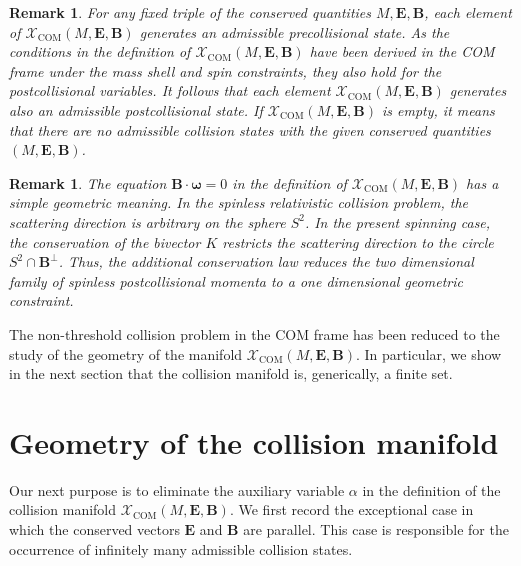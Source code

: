 \documentclass[10pt,a4paper]{amsart}
\newtheorem{remark}[theorem]{Remark}
\begin{document}
\begin{remark}
For any fixed triple of the conserved quantities $M, {\bm E}, {\bm B}$, each element of $\mathcal{X}_\mathrm{COM}(M, {\bm E}, {\bm B})$ generates an admissible precollisional state. As the conditions in the definition of $\mathcal{X}_\mathrm{COM}(M,{\bm E}, {\bm B})$ have been derived in the COM frame under the mass shell and spin constraints, they also hold for the postcollisional variables. It follows that each element $\mathcal{X}_\mathrm{COM}(M,{\bm E}, {\bm B})$ generates also an admissible postcollisional state.
If $\mathcal{X}_\mathrm{COM}(M,{\bm E}, {\bm B})$ is empty, it means that there are no admissible collision states with the given conserved quantities $(M,{\bm E}, {\bm B})$.
\end{remark}

\begin{remark}
The equation ${\bm B}\cdot{\bm\omega}=0$ in the definition of $\mathcal{X}_\mathrm{COM}(M,{\bm E}, {\bm B})$ 
has a simple geometric meaning. In the spinless relativistic collision problem, the scattering direction is arbitrary on the sphere $S^2$. In the present spinning case, the conservation of the bivector $K$ restricts the scattering direction to the circle $S^2\cap{\bm B}^{\perp}$.
Thus, the additional conservation law reduces the two dimensional family of spinless postcollisional momenta to a one dimensional geometric constraint.
\end{remark}

The non-threshold collision problem in the COM frame has been reduced to the study of the geometry of the manifold $\mathcal{X}_\mathrm{COM}(M,{\bm E}, {\bm B})$. In particular, we show in the next section that the collision manifold is, generically, a finite set. 

\section{Geometry of the collision manifold}\label{geometry}
Our next purpose  is to eliminate the auxiliary variable $\alpha$ in the definition of the collision manifold $\mathcal{X}_\mathrm{COM}(M,{\bm E}, {\bm B})$. 
We first record the exceptional case in which the conserved vectors ${\bm E}$ and ${\bm B}$ are parallel. This case is responsible for the occurrence of infinitely many admissible collision states.
\end{document}
